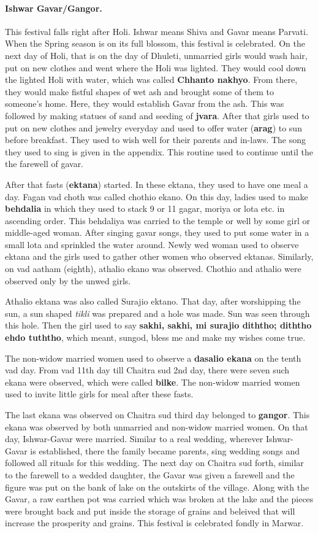 \paragraph{Ishwar Gavar/Gangor.} This festival falls right after Holi. Ishwar
means Shiva and Gavar means Parvati. When the Spring season is on its full
blossom, this festival is celebrated. On the next day of Holi, that is on the
day of Dhuleti, unmarried girls would wash hair, put on new clothes and went
where the Holi was lighted. They would cool down the lighted Holi with water,
which was called \textbf{Chhanto nakhyo}. From there, they would make fistful
shapes of wet ash and brought some of them to someone's home. Here, they would establish
Gavar from the ash. This was followed by making statues of sand and seeding of
\textbf{jvara}.
After that girls used to put on new clothes and jewelry everyday and used to
offer water (\textbf{arag}) to sun before breakfast. They used to wish well for
their parents and in-laws. The song they used to sing is given in the appendix.
This routine used to continue until the the farewell of gavar.

After that fasts (\textbf{ektana}) started. In these ektana, they used to have
one meal a day. Fagan vad choth was called chothio ekano. On this day, ladies
used to make \textbf{behdalia} in which they used to stack 9 or 11 gagar, moriya
or lota etc. in ascending order. This behdaliya was carried to the temple or
well by some girl or middle-aged woman. After singing gavar songs, they used to
put some water in a small lota and sprinkled the water around. Newly wed woman
used to observe ektana and the girls used to gather other women who observed
ektanas. Similarly, on vad aatham (eighth), athalio ekano was observed. Chothio
and athalio were observed only by the unwed girls.

Athalio ektana was also called Surajio ektano. That day, after worshipping the
sun, a sun shaped \textit{tikli} was prepared and a hole was made. Sun was seen
through this hole. Then the girl used to say \textbf{sakhi, sakhi, mi surajio
diththo; diththo ehdo tuththo}, which meant, sungod, bless me and make my wishes
come true.

The non-widow married women used to observe a \textbf{dasalio ekana}
on the tenth vad day. From vad 11th day till Chaitra sud 2nd day, there were
seven such ekana were observed, which were called \textbf{bilke}. The non-widow
married women used to invite little girls for meal after these fasts.

The last ekana was observed on Chaitra sud third day belonged to
\textbf{gangor}. This ekana was observed by both unmarried and non-widow married
women. On that day, Ishwar-Gavar were married. Similar to a real wedding,
wherever Ishwar-Gavar is established, there the family became parents, sing
wedding songs and followed all rituals for this wedding. The next day on Chaitra
sud forth, similar to the farewell to a wedded daughter, the Gavar was given a
farewell and the figure was put on the bank of lake on the outskirts of the
village. Along with the Gavar, a raw earthen pot was carried which was broken at
the lake and the pieces were brought back and put inside the storage of grains
and beleived that will increase the prosperity and grains. This festival is
celebrated fondly in Marwar.

